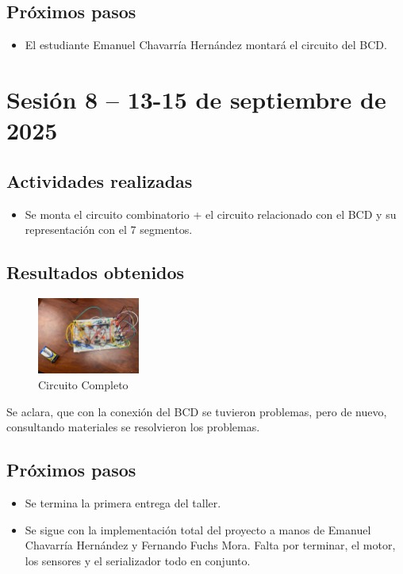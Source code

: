 \documentclass[12pt,letterpaper]{article}
\begin{document}
\subsection*{Próximos pasos}
\begin{itemize}
    \item El estudiante Emanuel Chavarría Hernández montará el circuito del BCD.
\end{itemize}


\section{Sesión 8 -- 13-15 de septiembre de 2025}
\subsection*{Actividades realizadas}
\begin{itemize}
    \item Se monta el circuito combinatorio  + el circuito relacionado con el BCD y su representación con el 7 segmentos.
\end{itemize}

\subsection*{Resultados obtenidos}
\begin{figure}[H]
    \centering
    \includegraphics[width=0.3\textwidth]{images/todo_real.jpg} %
    \caption{Circuito Completo}
    \label{fig:todo_taller}
\end{figure}
Se aclara, que con la conexión del BCD se tuvieron problemas, pero de nuevo, consultando materiales se resolvieron los problemas.

\subsection*{Próximos pasos}
\begin{itemize}
    \item Se termina la primera entrega del taller.
    \item Se sigue con la implementación total del proyecto a manos de Emanuel Chavarría Hernández y Fernando Fuchs Mora. Falta por terminar, el motor, los sensores y el serializador todo en conjunto.
\end{itemize}
\end{document}
